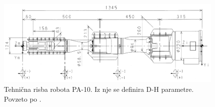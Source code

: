 \begin{figure}
	\centering
	\includegraphics[width=\textwidth]{./Slike/pa10-dh.png}
	\caption{Tehni\v{c}na risba robota PA-10. Iz nje se definira D-H parametre. Povzeto po \cite{pa10-manual}.}
	\label{fig:pa10-dh}
\end{figure}
